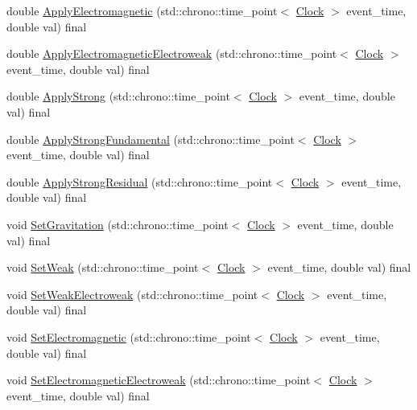 \begin{DoxyCompactItemize}
\item 
double \hyperlink{class_solid_ab546d607d6f0bf70dc5e6bbac8baf287}{Apply\+Electromagnetic} (std\+::chrono\+::time\+\_\+point$<$ \hyperlink{universe_8h_a0ef8d951d1ca5ab3cfaf7ab4c7a6fd80}{Clock} $>$ event\+\_\+time, double val) final
\item 
double \hyperlink{class_solid_a46702e3109994b310eb4f1fba5610e0b}{Apply\+Electromagnetic\+Electroweak} (std\+::chrono\+::time\+\_\+point$<$ \hyperlink{universe_8h_a0ef8d951d1ca5ab3cfaf7ab4c7a6fd80}{Clock} $>$ event\+\_\+time, double val) final
\item 
double \hyperlink{class_solid_a0801ec0382bc509191575bcf9f5c83c1}{Apply\+Strong} (std\+::chrono\+::time\+\_\+point$<$ \hyperlink{universe_8h_a0ef8d951d1ca5ab3cfaf7ab4c7a6fd80}{Clock} $>$ event\+\_\+time, double val) final
\item 
double \hyperlink{class_solid_abd8fff76385306f97aa65dfd6b867fc6}{Apply\+Strong\+Fundamental} (std\+::chrono\+::time\+\_\+point$<$ \hyperlink{universe_8h_a0ef8d951d1ca5ab3cfaf7ab4c7a6fd80}{Clock} $>$ event\+\_\+time, double val) final
\item 
double \hyperlink{class_solid_a07534fa79bb8a6eb32e081e5158ba9e5}{Apply\+Strong\+Residual} (std\+::chrono\+::time\+\_\+point$<$ \hyperlink{universe_8h_a0ef8d951d1ca5ab3cfaf7ab4c7a6fd80}{Clock} $>$ event\+\_\+time, double val) final
\item 
void \hyperlink{class_solid_ae237f2c713868c133e28ed7f75fc9125}{Set\+Gravitation} (std\+::chrono\+::time\+\_\+point$<$ \hyperlink{universe_8h_a0ef8d951d1ca5ab3cfaf7ab4c7a6fd80}{Clock} $>$ event\+\_\+time, double val) final
\item 
void \hyperlink{class_solid_aa28e0f7e4de2fc0c1e28d385214296bf}{Set\+Weak} (std\+::chrono\+::time\+\_\+point$<$ \hyperlink{universe_8h_a0ef8d951d1ca5ab3cfaf7ab4c7a6fd80}{Clock} $>$ event\+\_\+time, double val) final
\item 
void \hyperlink{class_solid_adb34befc66f8c681f3a85c44e0d00e3a}{Set\+Weak\+Electroweak} (std\+::chrono\+::time\+\_\+point$<$ \hyperlink{universe_8h_a0ef8d951d1ca5ab3cfaf7ab4c7a6fd80}{Clock} $>$ event\+\_\+time, double val) final
\item 
void \hyperlink{class_solid_a9a660f9d94f597712c67922aa1d4d795}{Set\+Electromagnetic} (std\+::chrono\+::time\+\_\+point$<$ \hyperlink{universe_8h_a0ef8d951d1ca5ab3cfaf7ab4c7a6fd80}{Clock} $>$ event\+\_\+time, double val) final
\item 
void \hyperlink{class_solid_a6617ae9fe4707d760a23b54eddf00dec}{Set\+Electromagnetic\+Electroweak} (std\+::chrono\+::time\+\_\+point$<$ \hyperlink{universe_8h_a0ef8d951d1ca5ab3cfaf7ab4c7a6fd80}{Clock} $>$ event\+\_\+time, double val) final

\end{DoxyCompactItemize}
